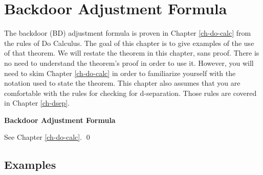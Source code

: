 \chapter{Backdoor Adjustment Formula}
\label{ch-bdoor}

The backdoor (BD) adjustment
formula is proven in
Chapter \ref{ch-do-calc}
from the rules of Do Calculus.
The goal 
of this chapter is
to give examples
of the use of that
theorem.
We will restate
the theorem in this chapter,
sans proof.
There is no need
to understand the
theorem's
proof in order to use it.
However, you
will
need to skim Chapter \ref{ch-do-calc}
in order to familiarize 
yourself with
the notation used to state the 
theorem.
This chapter also assumes
that you are comfortable 
with the  rules 
for checking for d-separation. Those rules
are covered in Chapter \ref{ch-dsep}.



\bdoordef
\begin{claim} {\bf Backdoor Adjustment
 Formula}

\bdoorclaim
\end{claim}
\proof 
See Chapter \ref{ch-do-calc}.
\qed



\section{Examples}

